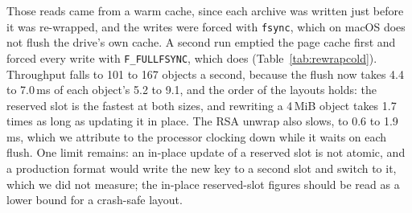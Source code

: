 Those reads came from a warm cache, since each archive was written just
before it was re-wrapped, and the writes were forced with \texttt{fsync},
which on macOS does not flush the drive's own cache. A second run emptied the
page cache first and forced every write with \texttt{F\_FULLFSYNC}, which does
(Table~\ref{tab:rewrapcold}). Throughput falls to 101 to 167 objects a
second, because the flush now takes 4.4 to 7.0\,ms of each object's 5.2 to
9.1, and the order of the layouts holds: the reserved slot is the fastest at
both sizes, and rewriting a 4\,MiB object takes 1.7 times as long as updating
it in place. The RSA unwrap also slows, to 0.6 to 1.9\,ms, which we attribute
to the processor clocking down while it waits on each flush. One limit
remains: an in-place update of a reserved slot is not atomic, and a production
format would write the new key to a second slot and switch to it, which we did
not measure; the in-place reserved-slot figures should be read as a lower
bound for a crash-safe layout.

